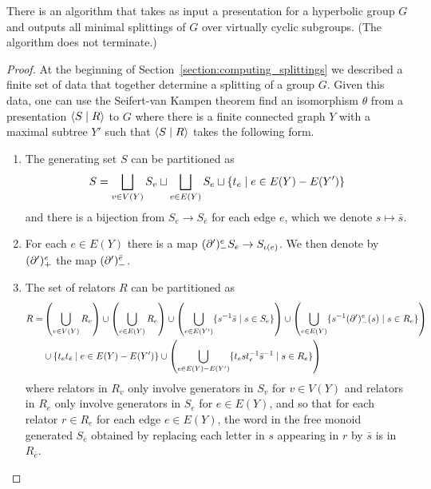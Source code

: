 \begin{lemma}\label{lemma:finding_a_splitting}
  There is an algorithm that takes as input a presentation for a hyperbolic group $G$ and outputs all minimal splittings of $G$ over virtually cyclic subgroups. (The algorithm does not terminate.)
\end{lemma}

\begin{proof}
At the beginning of Section~\ref{section:computing_splittings} we described a finite set of data that together determine a splitting of a group $G$.
Given this data, one can use the Seifert-van Kampen theorem find an isomorphism $\theta$ from a presentation $\langle S \mid R\rangle$ to $G$ where there is a finite connected graph $Y$ with a maximal subtree $Y'$ such that $\langle S \mid R\rangle$ takes the following form.
\begin{enumerate}
  \item\label{condition:generators_partition} The generating set $S$ can be partitioned as 
    \begin{align*}
      S = \bigsqcup_{v \in V(Y)} S_v \sqcup \bigsqcup_{e \in E(Y)} S_e \sqcup \{t_e \mid e \in E(Y) - E(Y')\}
    \end{align*}
    and there is a bijection from $S_e \to S_{\bar{e}}$ for each edge $e$, which we denote $s \mapsto \bar{s}$.
  \item\label{condition:boundary_maps_exist} For each $e \in E(Y)$ there is a map $(\partial')^e_{-} S_e \to S_{\operatorname{\iota}(e)}$. 
    We then denote by $(\partial')^e_{+}$ the map $(\partial')^{\bar{e}}_{-}$.
  \item\label{condition:relators_partition} The set of relators $R$ can be partitioned as 
    \begin{align*}
      R =&    \left(\bigcup_{v \in V(Y)} R_v\right) 
      \cup \left(\bigcup_{e \in E(Y)} R_e \right)
      \cup \left(\bigcup_{e \in E(Y')} \{s^{-1}\bar{s} \mid s \in S_e\}\right)
      \cup \left(\bigcup_{e \in E(Y)} \{s^{-1}(\partial')^e_{-}(s) \mid s \in R_e\}\right) \\
      & \cup \{t_et_{\bar{e}} \mid e \in E(Y) - E(Y')\}
      \cup \left(\bigcup_{e \in E(Y) - E(Y')} \{t_est_e^{-1}\bar{s}^{-1} \mid s \in R_e\}\right)
    \end{align*}
    where relators in $R_v$ only involve generators in $S_v$ for $v \in V(Y)$ and relators in $R_e$ only involve generators in $S_e$ for $e \in E(Y)$, and so that for each relator $r \in R_e$ for each edge $e \in E(Y)$, the word in the free monoid generated $S_{\bar{e}}$ obtained by replacing each letter in $s$ appearing in $r$ by $\bar{s}$ is in $R_{\bar{e}}$.

\end{enumerate}
\end{proof}
